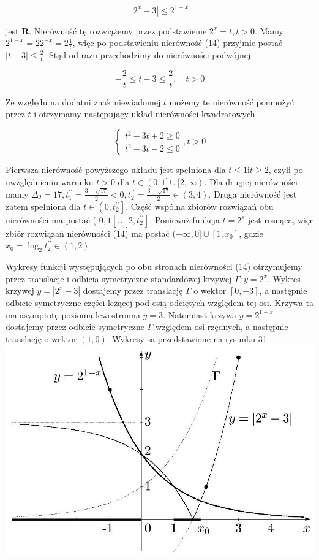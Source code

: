 \documentclass[10pt]{article}
\begin{document}
$$
\left|2^{x}-3\right| \leq 2^{1-x}
$$

jest $\mathbf{R}$. Nierówność tę rozwiążemy przez podstawienie $2^{x}=t, t>0$. Mamy $2^{1-x}=22^{-x}=2 \frac{1}{t}$, więc po podstawieniu nierówność (14) przyjmie postać $|t-3| \leq \frac{2}{t}$. Stąd od razu przechodzimy do nierówności podwójnej

$$
-\frac{2}{t} \leq t-3 \leq \frac{2}{t}, \quad t>0
$$

Ze względu na dodatni znak niewiadomej $t$ możemy tę nierówność pomnożyć przez $t$ i otrzymamy następujaçy układ nierówności kwadratowych

$$
\left\{\begin{array}{l}
t^{2}-3 t+2 \geq 0 \\
t^{2}-3 t-2 \leq 0
\end{array}, t>0\right.
$$

Pierwsza nierówność powyższego układu jest spełniona dla $t \leq 1 \mathrm{i} t \geq 2$, czyli po uwzględnieniu warunku $t>0$ dla $t \in(0,1] \cup[2, \infty)$. Dla drugiej nierówności mamy $\Delta_{2}=17, t_{1}^{\prime \prime}=\frac{3-\sqrt{17}}{2}<0, t_{2}^{\prime \prime}=\frac{3+\sqrt{17}}{2} \in(3,4)$. Druga nierówność jest zatem spełniona dla $t \in\left(0, t_{2}^{\prime \prime}\right]$. Część wspólna zbiorów rozwiązań obu nierówności ma postać ( $0,1\left[\cup\left[2, t_{2}^{\prime \prime}\right]\right.$. Ponieważ funkcja $t=2^{x}$ jest rosnąca, więc zbiór rozwiązań nierówności (14) ma postać $(-\infty, 0] \cup\left[1, x_{0}\right]$, gdzie $x_{0}=\log _{2} t_{2}^{\prime \prime} \in(1,2)$.

Wykresy funkcji występujących po obu stronach nierówności (14) otrzymujemy przez translacje i odbicia symetryczne standardowej krzywej $\Gamma: y=2^{x}$. Wykres krzywej $y=\left|2^{x}-3\right|$ dostajemy przez translację $\Gamma$ o wektor $[0,-3]$, a następnie odbicie symetryczne części leżącej pod osią odciętych względem tej osi. Krzywa ta ma asymptotę poziomą lewostronna $y=3$. Natomiast krzywa $y=2^{1-x}$ dostajemy przez odbicie symetryczne $\Gamma$ względem osi rzędnych, a następnie translację o wektor $(1,0)$. Wykresy sa przedstawione na rysunku 31.\\
\includegraphics[max width=\textwidth, center]{2024_11_16_fe5b564401bf7db98894g-128}
\end{document}
